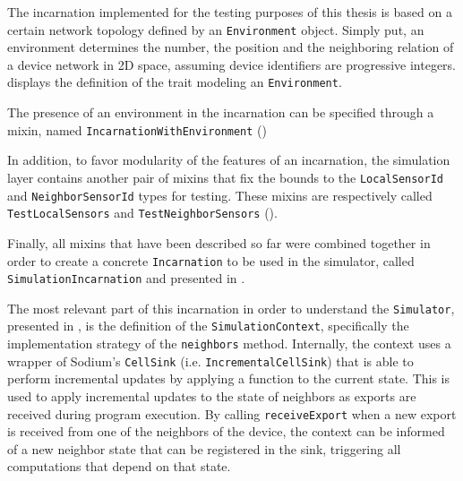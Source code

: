 The incarnation implemented for the testing purposes of this thesis is based on a certain network topology defined by an \texttt{Environment} object.
%
Simply put, an environment determines the number, the position and the neighboring relation of a device network in 2D space, assuming device identifiers are progressive integers.
%
 displays the definition of the trait modeling an \texttt{Environment}.
%

%
The presence of an environment in the incarnation can be specified through a mixin, named \texttt{IncarnationWithEnvironment} ()
%

%
In addition, to favor modularity of the features of an incarnation, the simulation layer contains another pair of mixins that fix the bounds to the \texttt{LocalSensorId} and \texttt{NeighborSensorId} types for testing.
%
These mixins are respectively called \texttt{TestLocalSensors} and \texttt{TestNeighborSensors} ().
%


Finally, all mixins that have been described so far were combined together in order to create a concrete \texttt{Incarnation} to be used in the simulator, called \texttt{SimulationIncarnation} and presented in .
%

%
The most relevant part of this incarnation in order to understand the \texttt{Simulator}, presented in , is the definition of the \texttt{SimulationContext}, specifically the implementation strategy of the \texttt{neighbors} method.
%
Internally, the context uses a wrapper of Sodium's \texttt{CellSink} (i.e. \texttt{IncrementalCellSink}) that is able to perform incremental updates by applying a function to the current state.
%
This is used to apply incremental updates to the state of neighbors as exports are received during program execution.
%
By calling \texttt{receiveExport} when a new export is received from one of the neighbors of the device, the context can be informed of a new neighbor state that can be registered in the sink, triggering all computations that depend on that state.

